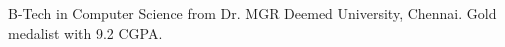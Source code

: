 %
%
%


\begin{scholarship}
					  {B-Tech in Computer Science from Dr. MGR Deemed University, Chennai. Gold medalist with 9.2 CGPA.}

\end{scholarship}
